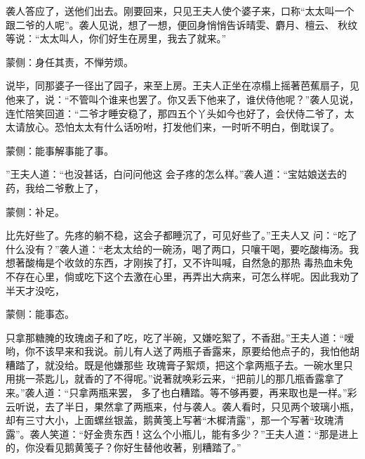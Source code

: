 \begin{parag}
    袭人答应了，送他们出去。刚要回来，只见王夫人使个婆子来，口称“太太叫一个跟二爷的人呢”。袭人见说，想了一想，便回身悄悄告诉晴雯、麝月、檀云、 秋纹等说：“太太叫人，你们好生在房里，我去了就来。”\begin{note}蒙侧：身任其责，不惮劳烦。\end{note}说毕，同那婆子一径出了园子，来至上房。王夫人正坐在凉榻上摇著芭蕉扇子，见他来了，说：“不管叫个谁来也罢了。你又丢下他来了，谁伏侍他呢？”袭人见说，连忙陪笑回道：“二爷才睡安稳了，那四五个丫头如今也好了，会伏侍二爷了，太太请放心。恐怕太太有什么话吩咐，打发他们来，一时听不明白，倒耽误了。\begin{note}蒙侧：能事解事能了事。\end{note}”王夫人道：“也没甚话，白问问他这 会子疼的怎么样。”袭人道：“宝姑娘送去的药，我给二爷敷上了，\begin{note}蒙侧：补足。\end{note}比先好些了。先疼的躺不稳，这会子都睡沉了，可见好些了。”王夫人又 问：“吃了什么没有？”袭人道：“老太太给的一碗汤，喝了两口，只嚷干喝，要吃酸梅汤。我想著酸梅是个收敛的东西，才刚挨了打，又不许叫喊，自然急的那热 毒热血未免不存在心里，倘或吃下这个去激在心里，再弄出大病来，可怎么样呢。因此我劝了半天才没吃，\begin{note}蒙侧：能事态。\end{note}只拿那糖腌的玫瑰卤子和了吃，吃了半碗，又嫌吃絮了，不香甜。”王夫人道：“嗳哟，你不该早来和我说。前儿有人送了两瓶子香露来，原要给他点子的，我怕他胡糟踏了，就没给。既是他嫌那些 玫瑰膏子絮烦，把这个拿两瓶子去。一碗水里只用挑一茶匙儿，就香的了不得呢。”说著就唤彩云来，“把前儿的那几瓶香露拿了来。”袭人道：“只拿两瓶来罢， 多了也白糟踏。等不够再要，再来取也是一样。”彩云听说，去了半日，果然拿了两瓶来，付与袭人。袭人看时，只见两个玻璃小瓶，却有三寸大小，上面螺丝银盖，鹅黄笺上写著“木樨清露”，那一个写著“玫瑰清露”。袭人笑道：“好金贵东西！这么个小瓶儿，能有多少？”王夫人道：“那是进上的，你没看见鹅黄笺子？你好生替他收著，别糟踏了。”
\end{parag}


